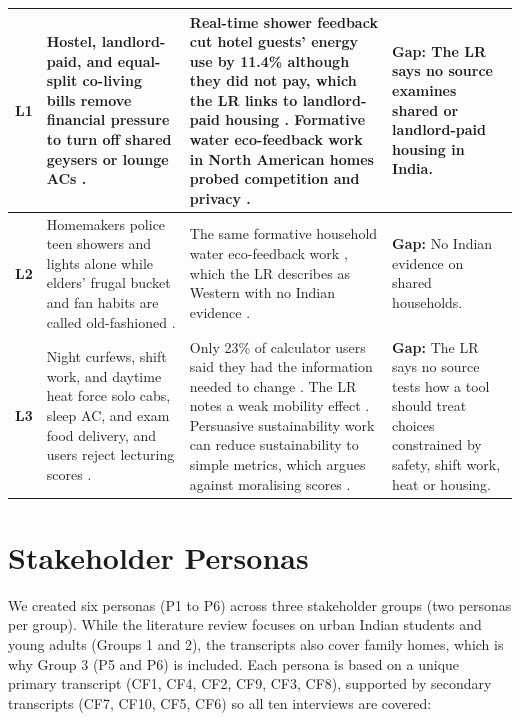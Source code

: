 \documentclass[12pt, a4paper]{article}
\begin{document}
\begin{longtable}{|>{\raggedright\arraybackslash}p{1.2cm}|>{\raggedright\arraybackslash}p{4.5cm}|>{\raggedright\arraybackslash}p{5.5cm}|>{\raggedright\arraybackslash}p{4.3cm}|}
\textbf{L1} & Hostel, landlord-paid, and equal-split co-living bills remove financial pressure to turn off shared geysers or lounge ACs \cite{cf1, cf7, cf10}. & Real-time shower feedback cut hotel guests' energy use by 11.4\% although they did not pay, which the LR links to landlord-paid housing \cite{tiefenbeck2019}. Formative water eco-feedback work in North American homes probed competition and privacy \cite{froehlich2012}. & \textbf{Gap:} The LR says no source examines shared or landlord-paid housing in India. \\
\hline

\textbf{L2} & Homemakers police teen showers and lights alone while elders' frugal bucket and fan habits are called old-fashioned \cite{cf1, cf3, cf5, cf6, cf8}. & The same formative household water eco-feedback work \cite{froehlich2012}, which the LR describes as Western with no Indian evidence \cite{froehlich2012, tiefenbeck2019}. & \textbf{Gap:} No Indian evidence on shared households. \\
\hline

\textbf{L3} & Night curfews, shift work, and daytime heat force solo cabs, sleep AC, and exam food delivery, and users reject lecturing scores \cite{cf1, cf2, cf4, cf5, cf9}. & Only 23\% of calculator users said they had the information needed to change \cite{collins2020}. The LR notes a weak mobility effect \cite{hoffmann2024}. Persuasive sustainability work can reduce sustainability to simple metrics, which argues against moralising scores \cite{brynjarsdottir2012}. & \textbf{Gap:} The LR says no source tests how a tool should treat choices constrained by safety, shift work, heat or housing. \\
\hline
\end{longtable}

\section{Stakeholder Personas}
We created six personas (P1 to P6) across three stakeholder groups (two personas per group). While the literature review focuses on urban Indian students and young adults (Groups 1 and 2), the transcripts also cover family homes, which is why Group 3 (P5 and P6) is included. Each persona is based on a unique primary transcript (CF1, CF4, CF2, CF9, CF3, CF8), supported by secondary transcripts (CF7, CF10, CF5, CF6) so all ten interviews are covered:
\end{document}
